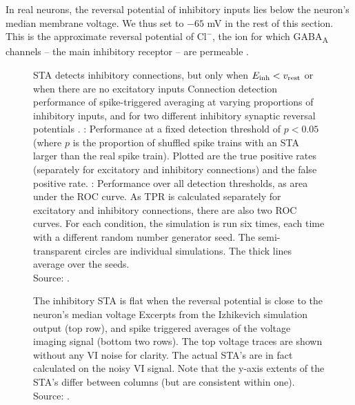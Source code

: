 In real neurons, the reversal potential of inhibitory inputs lies below the neuron's median membrane voltage. We thus set \vinh to $-65$ mV in the rest of this section. This is the approximate reversal potential of $\mathrm{Cl}^-$, the ion for which GABA\textsubscript{A} channels -- the main inhibitory receptor -- are permeable \cite{Dayan2001TheoreticalNeuroscienceComputational,Kandel2013PrinciplesNeuralScience}.

\begin{figure}
  \captionn
  {STA detects inhibitory connections, but only when $E_{\text{inh}} < v_\text{rest}$ or when there are no excitatory inputs}
  {
    Connection detection performance of spike-triggered averaging at varying proportions of inhibitory inputs, and for two different inhibitory synaptic reversal potentials \vinh.
    \Top: Performance at a fixed detection threshold of $p < 0.05$ (where $p$ is the proportion of shuffled spike trains with an STA larger than the real spike train). Plotted are the true positive rates (separately for excitatory and inhibitory connections) and the false positive rate.
    \Bottom: Performance over all detection thresholds, as
    area under the ROC curve. As TPR is calculated separately for excitatory and inhibitory connections, there are also two ROC curves.
    For each condition, the simulation is run six times, each time with a different random number generator seed. The semi-transparent circles are individual simulations. The thick lines average over the seeds.\\
    Source: .
  }
  \label{fig:N_1_IE}
\end{figure}

\begin{figure}
    \hspace*{-2.5em}
  \captionn
  {The inhibitory STA is flat when the reversal potential is close to the neuron's median voltage}
  {Excerpts from the Izhikevich simulation output (top row), and spike triggered averages of the voltage imaging signal (bottom two rows). The top voltage traces are shown without any VI noise for clarity. The actual STA's are in fact calculated on the noisy VI signal. Note that the y-axis extents of the STA's differ between columns (but are consistent within one).\\
  Source: .}
  \label{fig:N_1_signals}
\end{figure}



